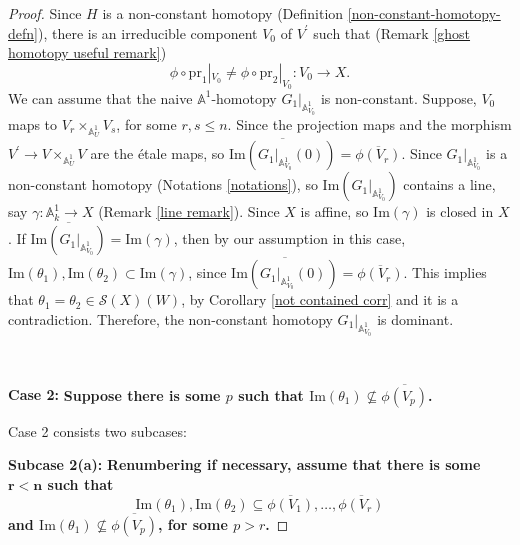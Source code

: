 \documentclass[11pt, reqno]{amsart}
\theoremstyle{plain}
\theoremstyle{definition}
\newcommand{\A}{{\mathbb A}}
\begin{document}
\begin{proof}
  Since $H$ is a non-constant homotopy (Definition \ref{non-constant-homotopy-defn}), there is an irreducible component $V_0$ of $V^{\prime}$ such that (Remark \ref{ghost homotopy useful remark})
$$\phi \circ \text{pr}_1|_{V_0} \neq \phi \circ \text{pr}_2|_{V_0}: V_0 \to X.$$
We can assume that the naive $\mathbb{A}^1$-homotopy $G_1|_{\mathbb{A}^1_{V_0}}$ is non-constant.
Suppose, $V_0$ maps to $V_r \times_{\mathbb{A}^1_U} V_s$, for some $r, s \leq n$. Since the projection maps and the morphism $V^{\prime} \to V \times_{\mathbb{A}^1_U} V$ are the \'etale maps, so $\overline{\text{Im}(G_1|_{\mathbb{A}^1_{V_0}}(0))} = \overline{\phi(V_r)}$. 
Since $G_1|_{\mathbb{A}^1_{V_0}}$ is a non-constant homotopy (Notations \ref{notations}), so $\text{Im}(G_1|_{\mathbb{A}^1_{V_0}})$ contains a line, say $\gamma: \A^1_k \to X$ (Remark \ref{line remark}). Since $X$ is affine, so $\text{Im}(\gamma)$ is closed in $X$. If $\overline{\text{Im}(G_1|_{\mathbb{A}^1_{V_0}})} = \text{Im}(\gamma)$, then by our assumption in this case, $\text{Im}(\theta_1), \text{Im}(\theta_2) \subset \text{Im}(\gamma)$, since $\overline{\text{Im}(G_1|_{\mathbb{A}^1_{V_0}}(0))} = \overline{\phi(V_r)}$. This implies that $\theta_1 = \theta_2 \in \mathcal{S}(X)(W)$, by Corollary \ref{not contained corr} and it is a contradiction. Therefore, the non-constant homotopy $G_1|_{\mathbb{A}^1_{V_0}}$ is dominant.

\


\textbf{Case 2:} \textbf{Suppose there is some $p$ such that $\text{Im}(\theta_1) \nsubseteq \overline{\phi(V_p)}$.}

Case 2 consists two subcases:

     \textbf{Subcase 2(a):} \textbf{Renumbering if necessary, assume that there is some $\mathbf{r < n}$ such that 
$$\text{Im}(\theta_1), \text{Im}(\theta_2) \subseteq \overline{\phi(V_1)}, \dots, \overline{\phi(V_r)}$$ 
and $\text{Im}(\theta_1)  \nsubseteq \overline{\phi(V_p)}$, for some $p >r$.
}


\end{proof}
\end{document}
